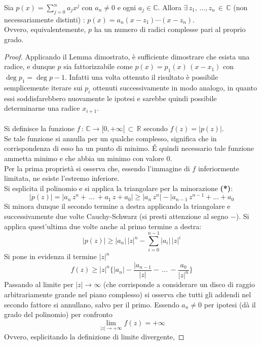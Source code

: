 \documentclass[10pt]{article}
\theoremstyle{plain}
\begin{document}
\begin{ther}
Sia $p(x) = \sum\limits_{j=0}^n a_j x^j$ con $a_n \neq 0$ e ogni $a_j \in \mathbb{C}$. Allora $\exists \, z_1, \, ..., z_n \, \in \, \mathbb{C}$ (non necessariamente distinti) : $p(x) = a_n(x-z_1) \cdots (x - z_n)$.
\\Ovvero, equivalentemente, $p$ ha un numero di radici complesse pari al proprio grado.
\end{ther}
\begin{proof}
Applicando il Lemma dimostrato, è sufficiente dimostrare che esista una radice, e dunque $p$ sia fattorizzabile come $p(x) = p_1(x) \, (x-x_1)$ con $\deg p_1 = \deg p - 1$. Infatti una volta ottenuto il risultato è possibile semplicemente iterare sui $p_i$ ottenuti successivamente in modo analogo, in quanto essi soddisfarebbero nuovamente le ipotesi e sarebbe quindi possibile determinarne una radice $x_{i+1}$.
\\~\\Si definisce la funzione $f \, : \, \mathbb{C} \rightarrow [0, +\infty[ \, \subset \, \mathbb{R}$ secondo $f(z) = |p(z)|$.
\\Se tale funzione si annulla per un qualche complesso, significa che in corrispondenza di esso ha un punto di minimo. \'E quindi necessario tale funzione ammetta minimo e che abbia un minimo con valore $0$.
\\Per la prima proprietà si osserva che, essendo l'immagine di $f$ inferiormente limitata, ne esiste l'estremo inferiore.
\\Si esplicita il polinomio e si applica la triangolare per la minorazione \textbf{(*)}:
\[|p(z)| = |a_n \, z^n + \, ...\, + a_1 \, z + a_0| \geq |a_n \, z^n| - |a_{n-1}\, z^{n-1} + ... + a_0\]
Si minora dunque il secondo termine a destra applicando la triangolare e successivamente due volte Cauchy-Schwarz (si presti attenzione al segno $-$). Si applica quest'ultima due volte anche al primo termine a destra:
\[|p(z)| \geq |a_n| \, |z|^n - \sum\limits_{i=0}^{n-1} |a_i| \, |z|^i\]
Si pone in evidenza il termine $|z|^n$
\[f(z) \geq |z|^n \big\{|a_n| - \frac{|a_{n-1}}{|z|} - \, ...\, - \frac{a_0}{|z|^n} \big\}\]
Passando al limite per $|z| \rightarrow \infty$ (che corrisponde a considerare un disco di raggio arbitrariamente grande nel piano complesso) si osserva che tutti gli addendi nel secondo fattore si annullano, salvo per il primo. Essendo $a_n \neq 0$ per ipotesi (dà il grado del polinomio) per confronto
\[\lim\limits_{|z| \rightarrow +\infty}f(z) = + \infty\]
Ovvero, esplicitando la definizione di limite divergente,

\end{proof}
\end{document}
